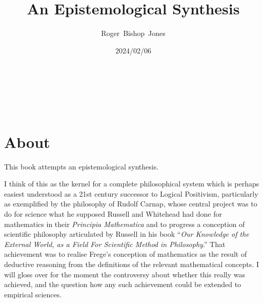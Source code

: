 \documentclass[10pt,titlepage]{book}
\title{\bf An Epistemological Synthesis}
\author{Roger~Bishop~Jones}
\date{\small 2024/02/06}
\newcommand{\ignore}[1]{}
\begin{document}
% 

                               
\begin{titlepage}
\maketitle





\end{titlepage}

\ \

\ignore{
\begin{centering}
{}
\end{centering}
}%

\setcounter{tocdepth}{2}
{\parskip-0pt\tableofcontents}


\hfill
\ 
\pagebreak







\section*{About}

This book attempts an epistemological synthesis.

I think of this as the kernel for a complete philosophical system which is perhaps easiest understood as a 21st century successor to Logical Positivism, particularly as exemplified by the philosophy of Rudolf Carnap, whose central project was to do for science what he supposed Russell and Whitehead had done for mathematics in their \emph{Principia Mathematica} \cite{russell1913} and to progress a conception of scientific philosophy articulated by Russell in his book ``\emph{Our Knowledge of the External World, as a Field For Scientific Method in Philosophy}.'' \cite{russell21}
That achievement was to realise Frege’s conception of mathematics as the result of deductive reasoning from the definitions of the relevant mathematical concepts.
I will gloss over for the moment the controversy about whether this really was achieved, and the question how any such achievement could be extended to empirical sciences.
\end{document}
